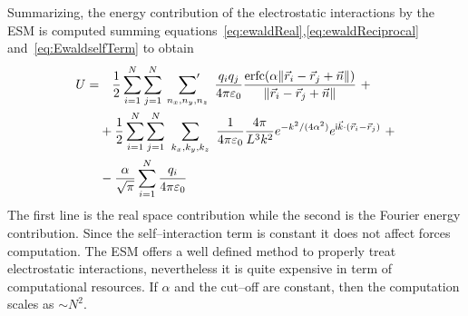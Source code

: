 Summarizing, the energy contribution of the electrostatic interactions by the \ac{ESM} is computed summing
equations~\eqref{eq:ewaldReal},\eqref{eq:ewaldReciprocal} and~\eqref{eq:EwaldselfTerm} to obtain
\begin{equation}
	\begin{aligned}
		U =&\quad\frac{1}{2}\sum_{i=1}^N\sum_{j=1}^N\ \sideset{}{'}\sum_{n_x,n_y,n_z}\ \frac{q_iq_j}{4 \pi \varepsilon_0} \frac{\erfc{(\alpha \| \vec r_i - \vec r_j + \vec n \|)}}{\| \vec r_i - \vec r_j + \vec n \|}\ + \\
		 &+ \frac{1}{2}\sum_{i=1}^N\sum_{j=1}^N\ \sum_{k_x,k_y,k_z}\  \frac{1}{4\pi\varepsilon_0}\frac{4\pi}{L^3k^2}e^{-k^2/(4\alpha^2)}e^{\mathsf{i}{\vec k \cdot (\vec r_i - \vec r_j)}}\ + \\
		 &- \frac{\alpha}{\sqrt{\pi}}\sum_{i=1}^N\frac{q_i}{4\pi\varepsilon_0}
	\end{aligned}
	\label{eq:EwaldEnergy}
\end{equation}
The first line is the real space contribution while the second is the Fourier energy contribution. Since the
self--interaction term is constant it does not affect forces computation. The \ac{ESM} offers a well defined
method to properly treat electrostatic interactions, nevertheless it is quite expensive in term of computational
resources. If $\alpha$ and the cut--off are constant, then the computation scales as $\sim N^2$.

